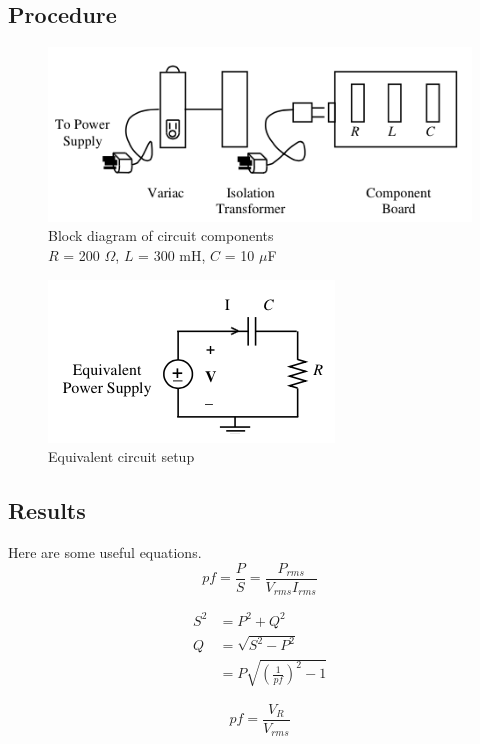 \documentclass[12pt]{article}
\newcommand{\rms}{\ensuremath{_{rms}}}
\begin{document}
\subsection{Procedure}\label{sec:pow_procedure}
\begin{figure}[h]
	\centering
	\includegraphics[scale=0.75]{power_components}
	\caption{Block diagram of circuit components\\$R$ = 200 $\Omega$, $L$ = 300 mH, $C$ = 10 $\mu$F}
	\label{fig:res_diagram}
\end{figure}

\begin{figure}[h]
	\centering
	\includegraphics[scale=0.75]{power_diagram}
	\caption{Equivalent circuit setup}
	\label{fig:res_diagram}
\end{figure}

\subsection{Results}\label{sec:pow_results}
Here are some useful equations.
\begin{equation*}
	pf = \frac{P}{S} = \frac{P\rms}{V\rms I\rms}
\end{equation*}

\begin{align*}
	S^2 &= P^2 + Q^2 \\
	Q 	&= \sqrt{S^2 - P^2} \\
	  	&= P\sqrt{\left(\frac{1}{pf}\right)^2 - 1}
\end{align*}

\begin{equation*}
	pf = \frac{V_R}{V\rms}
\end{equation*}
\end{document}
